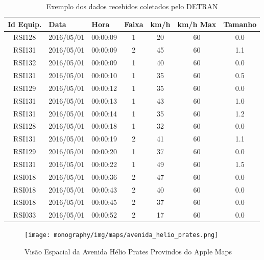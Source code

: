 \begin{table}[htbp]
    \begin{tabular}{ccccccc}
    \toprule
    \multicolumn{1}{l}{\textbf{Id Equip.}} & \multicolumn{1}{l}{\textbf{Data}} & \multicolumn{1}{l}{\textbf{Hora}} & \multicolumn{1}{l}{\textbf{Faixa}} & \multicolumn{1}{l}{\textbf{km/h}} & \multicolumn{1}{l}{\textbf{km/h Max}} & \multicolumn{1}{l}{\textbf{Tamanho}} \\ 
    \midrule
        RSI128 & 2016/05/01 & 00:00:09 & 1 & 20 & 60 & 0.0 \\
    \midrule
    RSI131 & 2016/05/01 & 00:00:09 & 2 & 45 & 60 & 1.1 \\
    \midrule
    RSI132 & 2016/05/01 & 00:00:09 & 1 & 40 & 60 & 0.0 \\
    \midrule
    RSI131 & 2016/05/01 & 00:00:10 & 1 & 35 & 60 & 0.5 \\
    \midrule 
    RSI129 & 2016/05/01 & 00:00:12 & 1 & 35 & 60 & 0.0 \\
    \midrule
    RSI131 & 2016/05/01 & 00:00:13 & 1 & 43 & 60 & 1.0 \\
    \midrule
    RSI131 & 2016/05/01 & 00:00:14 & 1 & 35 & 60 & 1.2 \\
    \midrule
    RSI128 & 2016/05/01 & 00:00:18 & 1 & 32 & 60 & 0.0 \\
    \midrule
    RSI131 & 2016/05/01 & 00:00:19 & 2 & 41 & 60 & 1.1 \\
    \midrule
    RSI129 & 2016/05/01 & 00:00:20 & 1 & 37 & 60 & 0.0 \\
    \midrule
    RSI131 & 2016/05/01 & 00:00:22 & 1 & 49 & 60 & 1.5 \\
    \midrule
    RSI018 & 2016/05/01 & 00:00:36 & 2 & 47 & 60 & 0.0 \\
    \midrule
    RSI018 & 2016/05/01 & 00:00:43 & 2 & 40 & 60 & 0.0 \\
    \midrule
    RSI018 & 2016/05/01 & 00:00:45 & 2 & 37 & 60 & 0.0 \\
    \midrule
    RSI033 & 2016/05/01 & 00:00:52 & 2 & 17 & 60 & 0.0 \\
    \bottomrule
    \end{tabular}
    \label{table:data}
    \caption{Exemplo dos dados recebidos coletados pelo \acrshort{DETRAN}}
\end{table}

\begin{figure}[H]
    \centering
    \texttt{[image: monography/img/maps/avenida\_helio\_prates.png]}
    \label{figure:helio}
    \caption[Visão Espacial da Avenida Hélio Prates Provindos do Apple Maps]{Visão Espacial da Avenida Hélio Prates Provindos do Apple Maps}
\end{figure}

